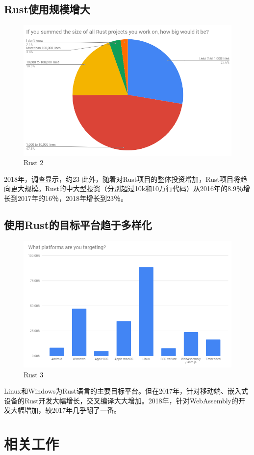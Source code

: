 \documentclass[12pt, a4paper]{article}
\begin{document}
	\subsection{Rust使用规模增大}
	
	\begin{figure}[H]
		\centering
		\includegraphics[width=0.7\linewidth]{n2}
		\caption{Rust 2}
		\label{fig:n2}
	\end{figure}
	2018年，调查显示，约23%
	此外，随着对Rust项目的整体投资增加，Rust项目将趋向更大规模。Rust的中大型投资（分别超过10k和10万行代码）从2016年的8.9％增长到2017年的16％，2018年增长到23％。    
	\subsection{使用Rust的目标平台趋于多样化}
	
	\begin{figure}[H]
		\centering
		\includegraphics[width=0.7\linewidth]{n3}
		\caption{Rust 3}
		\label{fig:n3}
	\end{figure}
	Linux和Windows为Rust语言的主要目标平台。但在2017年，针对移动端、嵌入式设备的Rust开发大幅增长，交叉编译大大增加。2018年，针对WebAssembly的开发大幅增加，较2017年几乎翻了一番。
	
	\section{相关工作}
	
\end{document}
